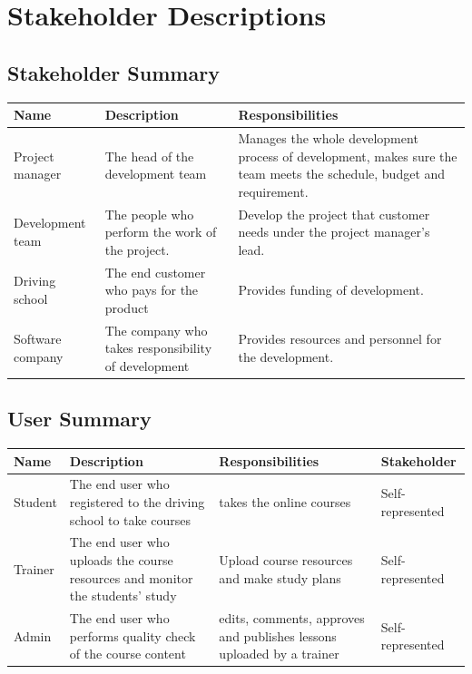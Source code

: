 \documentclass[a4paper]{article}
\begin{document}
\section{Stakeholder Descriptions}
\subsection{Stakeholder Summary}
\pagebreak
\begin{table}[ht]
\begin{tabular}{|l|p{6cm}|p{6cm}|}
\hline
Name & Description & Responsibilities \\ \hline
Project manager & The head of the development team & Manages the whole development process of development, makes sure the team meets the schedule, budget and requirement. \\ \hline
Development team & The people who perform the work of the project. & Develop the project that customer needs under the project manager’s lead. \\ \hline
Driving school & The end customer who pays for the product & Provides funding of development. \\ \hline
Software company & The company who takes responsibility of development & Provides resources and personnel for the development. \\
\hline

\end{tabular}
\end{table}

\subsection{User Summary}

\begin{table}[h]
\centering
\begin{tabular}{|l|p{5cm}|p{5cm}|l|}
\hline
Name & Description & Responsibilities & Stakeholder \\ \hline
Student & The end user who registered to the driving school to take courses & takes the online courses & Self-represented \\ \hline
Trainer & The end user who uploads the course resources and monitor the students’ study & Upload course resources and make study plans & Self-represented \\ \hline
Admin & The end user who performs quality check of the course content & edits, comments, approves and publishes  lessons uploaded by a trainer & Self-represented \\ 
\hline

\end{tabular}
\end{table}
\end{document}
